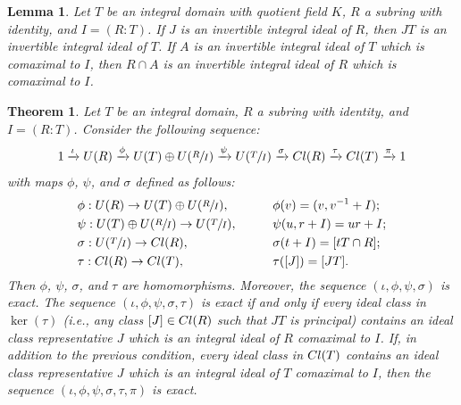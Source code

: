 \documentclass[10pt,a4paper]{amsart}
\newtheorem{lemma}{Lemma}
\newtheorem{theorem}{Theorem}
\newcommand{\Cl}{\textup{Cl}}
\begin{document}
\begin{lemma}
    \label{still invertible}
    Let $T$ be an integral domain with quotient field $K$, $R$ a subring with identity, and $I=(R:T)$. If $J$ is an invertible integral ideal of $R$, then $JT$ is an invertible integral ideal of $T$. If $A$ is an invertible integral ideal of $T$ which is comaximal to $I$, then $R\cap A$ is an invertible integral ideal of $R$ which is comaximal to $I$.
\end{lemma}

\begin{theorem}
    \label{exact sequence}
    Let $T$ be an integral domain, $R$ a subring with identity, and $I=(R:T)$. Consider the following sequence:
    $$1\xrightarrow{\iota} U(R)\xrightarrow{\phi} U(T)\oplus U(\sfrac{R}{I})\xrightarrow{\psi} U(\sfrac{T}{I})\xrightarrow{\sigma} \Cl(R)\xrightarrow{\tau}\Cl(T)\xrightarrow{\pi}1$$
    with maps $\phi$, $\psi$, and $\sigma$ defined as follows:
    \begin{alignat*}{2}
        &\phi:U(R)\to U(T)\oplus U(\sfrac{R}{I}),&&\quad\quad\phi(v)=(v,v^{-1}+I);\\
        &\psi:U(T)\oplus U(\sfrac{R}{I})\to U(\sfrac{T}{I}),&&\quad\quad\psi(u,r+I)=ur+I;\\
        &\sigma:U(\sfrac{T}{I})\to \Cl(R),&&\quad\quad\sigma(t+I)=[tT\cap R];\\
        &\tau:\Cl(R)\to\Cl(T),&&\quad\quad\tau([J])=[JT].
    \end{alignat*}
    Then $\phi$, $\psi$, $\sigma$, and $\tau$ are homomorphisms. Moreover, the sequence $(\iota,\phi,\psi,\sigma)$ is exact. The sequence $(\iota,\phi,\psi,\sigma,\tau)$ is exact if and only if every ideal class in $\ker(\tau)$ (i.e., any class $[J]\in\Cl(R)$ such that $JT$ is principal) contains an ideal class representative $J$ which is an integral ideal of $R$ comaximal to $I$. If, in addition to the previous condition, every ideal class in $\Cl(T)$ contains an ideal class representative $J$ which is an integral ideal of $T$ comaximal to $I$, then the sequence $(\iota,\phi,\psi,\sigma,\tau,\pi)$ is exact.
\end{theorem}
\end{document}
